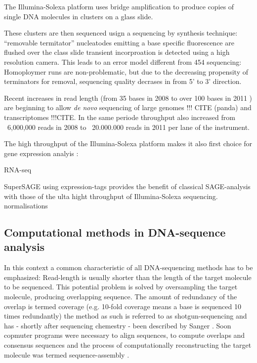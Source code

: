 The Illumina-Solexa platform uses bridge amplification to produce
copies of single DNA molecules in clusters on a glass slide. 





These
clusters are then sequenced usign a sequencing by synthesis technique:
``removable termitator'' nucleatodes emitting a base specific
fluorescence are flushed over the class slide transient incorproation
is detected using a high resolution camera. This leads to an error
model different from 454 sequencing: Homoploymer runs are
non-problematic, but due to the decreasing propensity of terminators
for removal, sequencing quality decrases in from 5' to 3' direction.





Recent increases in read length (from 35 bases in 2008 to over 100
bases in 2011 ) are beginning to allow \textit{de novo} sequencing of
large genomes !!! CITE (panda) and transcriptomes !!!CITE. In the same
periode throughput also increased from ~6,000,000 reads in 2008 to
~20.000.000 reads in 2011 per lane of the instrument.

The high throughput of the Illumina-Solexa platform makes it also
first choice for gene expression analyis \cite{pmid21627854}:

RNA-seq \cite{pmid19015660} 

SuperSAGE \cite{pmid20967605} using expression-tags provides the
benefit of classical SAGE-analysis \cite{pmid7570003} with those of
the ulta hight throughput of Illumina-Solexa
sequencing. normalisations



\subsection{Computational methods in DNA-sequence analysis}
\label{sec:comp-meth-dna}

In this context a common characteristic of all DNA-sequencing methods
has to be emphasized: Read-length is usually shorter than the length
of the target molecule to be sequenced. This potential problem is
solved by oversampling the target molecule, producing overlapping
sequence. The amount of redundancy of the overlap is termed coverage
(e.g. 10-fold coverage means a base is sequenced 10 times redundantly)
the method as such is referred to as shotgun-sequencing and has -
shortly after sequencing chemestry - been described by Sanger
\cite{pmid6260957}. Soon copmuter programs were necessary to align
sequences, to compute overlaps and consensus sequences
\cite{pmid461197} and the process of computationally reconstructing
the target molecule was termed sequence-assembly \cite{pmid6251542}.

